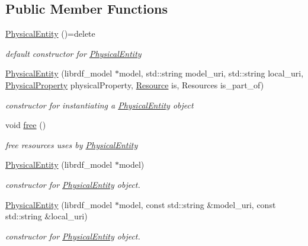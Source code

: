 \subsection*{Public Member Functions}
\begin{DoxyCompactItemize}
\item 
\hyperlink{classomexmeta_1_1PhysicalEntity_a9d29348a080c64f91ff6ec184fd45ece}{Physical\+Entity} ()=delete
\begin{DoxyCompactList}\small\item\em default constructor for \hyperlink{classomexmeta_1_1PhysicalEntity}{Physical\+Entity} \end{DoxyCompactList}\item 
\hyperlink{classomexmeta_1_1PhysicalEntity_a0341918665af91cacdb4481d037c42d2}{Physical\+Entity} (librdf\+\_\+model $\ast$model, std\+::string model\+\_\+uri, std\+::string local\+\_\+uri, \hyperlink{classomexmeta_1_1PhysicalProperty}{Physical\+Property} physical\+Property, \hyperlink{classomexmeta_1_1Resource}{Resource} is, Resources is\+\_\+part\+\_\+of)
\begin{DoxyCompactList}\small\item\em constructor for instantiating a \hyperlink{classomexmeta_1_1PhysicalEntity}{Physical\+Entity} object \end{DoxyCompactList}\item 
void \hyperlink{classomexmeta_1_1PhysicalEntity_a6fd4acd7255a01322c4a53d3e84df0ba}{free} ()
\begin{DoxyCompactList}\small\item\em free resources uses by \hyperlink{classomexmeta_1_1PhysicalEntity}{Physical\+Entity} \end{DoxyCompactList}\item 
\hyperlink{classomexmeta_1_1PhysicalEntity_a6bbbce71778e374de7d4e5e2e674fc2b}{Physical\+Entity} (librdf\+\_\+model $\ast$model)
\begin{DoxyCompactList}\small\item\em constructor for \hyperlink{classomexmeta_1_1PhysicalEntity}{Physical\+Entity} object. \end{DoxyCompactList}\item 
\hyperlink{classomexmeta_1_1PhysicalEntity_a5f583e60ad44bbb3dfcd11fdc6bc72cc}{Physical\+Entity} (librdf\+\_\+model $\ast$model, const std\+::string \&model\+\_\+uri, const std\+::string \&local\+\_\+uri)
\begin{DoxyCompactList}\small\item\em constructor for \hyperlink{classomexmeta_1_1PhysicalEntity}{Physical\+Entity} object. \end{DoxyCompactList}\item 

\end{DoxyCompactItemize}

